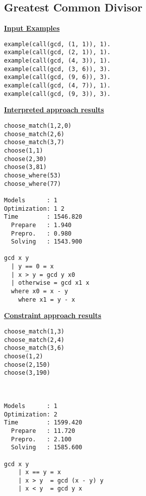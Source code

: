 \subsection{Greatest Common Divisor}
\underline{\textbf{Input Examples}}
\begin{lstlisting}
example(call(gcd, (1, 1)), 1).
example(call(gcd, (2, 1)), 1).
example(call(gcd, (4, 3)), 1).
example(call(gcd, (3, 6)), 3).
example(call(gcd, (9, 6)), 3).
example(call(gcd, (4, 7)), 1).
example(call(gcd, (9, 3)), 3).
\end{lstlisting}
\begin{multicols*}{2}
\underline{\textbf{Interpreted approach results}}
\begin{lstlisting}
choose_match(1,2,0) 
choose_match(2,6) 
choose_match(3,7)   
choose(1,1) 
choose(2,30) 
choose(3,81) 
choose_where(53) 
choose_where(77) 

Models      : 1     
Optimization: 1 2 
Time        : 1546.820
  Prepare   : 1.940
  Prepro.   : 0.980
  Solving   : 1543.900
  
gcd x y
  | y == 0 = x
  | x > y = gcd y x0
  | otherwise = gcd x1 x
  where x0 = x - y
  	where x1 = y - x
\end{lstlisting}
\vspace*{\fill}
\columnbreak
\underline{\textbf{Constraint approach results}}
\begin{lstlisting}
choose_match(1,3)
choose_match(2,4)
choose_match(3,6)  
choose(1,2) 
choose(2,150) 
choose(3,190) 



Models      : 1     
Optimization: 2 
Time        : 1599.420
  Prepare   : 11.720
  Prepro.   : 2.100
  Solving   : 1585.600

gcd x y
	| x == y = x
	| x > y	 = gcd (x - y) y
	| x < y	 = gcd y x
\end{lstlisting}
\end{multicols*}
\pagebreak

\pagebreak
%
%